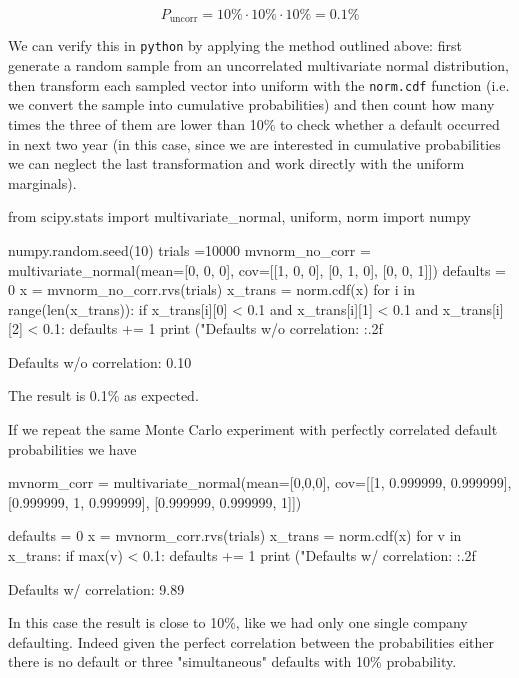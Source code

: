 \[P_{\mathrm{uncorr}} = 10\% \cdot 10\% \cdot 10\% = 0.1 \%\]

We can verify this in \texttt{python} by applying the method outlined above: first generate a random sample from an uncorrelated multivariate normal distribution, then transform each sampled vector into uniform with the \texttt{norm.cdf} function (i.e. we convert the sample into cumulative probabilities) and then count how many times the three of them are lower than 10\% to check whether a default occurred in next two year (in this case, since we are interested in cumulative probabilities we can neglect the last transformation and work directly with the uniform marginals).

\begin{ipython}
from scipy.stats import multivariate_normal, uniform, norm
import numpy

numpy.random.seed(10)
trials =10000
mvnorm_no_corr = multivariate_normal(mean=[0, 0, 0], cov=[[1, 0, 0],
                                                          [0, 1, 0],
                                                          [0, 0, 1]])
defaults = 0
x = mvnorm_no_corr.rvs(trials)
x_trans = norm.cdf(x)
for i in range(len(x_trans)):
    if x_trans[i][0] < 0.1 and x_trans[i][1] < 0.1 and x_trans[i][2] < 0.1:
        defaults += 1
print ("Defaults w/o correlation: {:.2f}%
\end{ipython}
\begin{ioutput}
Defaults w/o correlation: 0.10%
\end{ioutput}
\noindent
The result is 0.1\% as expected.

If we repeat the same Monte Carlo experiment with perfectly correlated default probabilities we have

\begin{ipython}
mvnorm_corr = multivariate_normal(mean=[0,0,0], 
                                  cov=[[1, 0.999999, 0.999999],
                                       [0.999999, 1, 0.999999],
                                       [0.999999, 0.999999, 1]])

defaults = 0
x = mvnorm_corr.rvs(trials)
x_trans = norm.cdf(x)
for v in x_trans:
    if max(v) < 0.1:
        defaults += 1
print ("Defaults w/ correlation: {:.2f}%
\end{ipython}
\begin{ioutput}
Defaults w/ correlation: 9.89%
\end{ioutput}
In this case the result is close to 10\%, like we had only one single company defaulting. 
Indeed given the perfect correlation between the probabilities either there is no default or three "simultaneous" defaults with 10\% probability.

